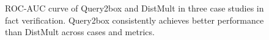 \begin{figure}
    \caption{ROC-AUC curve of Query2box and DistMult in three case studies in fact verification. Query2box consistently achieves better performance than DistMult across cases and metrics.}
    \label{fig:roc-verification}%
\end{figure}


